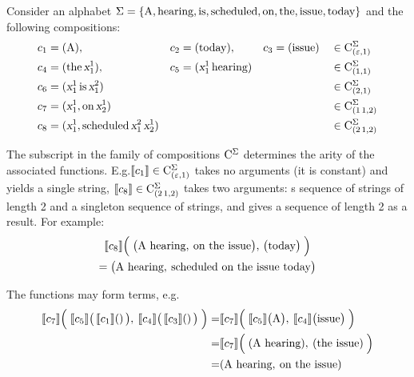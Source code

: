 \documentclass[../../document.tex]{subfiles}
\begin{document}
    \begin{example}\label{ex:lcfrs:comp}
        Consider an alphabet \(\Sigma=\{\text{A}, \text{hearing}, \text{is}, \text{scheduled}, \text{on}, \text{the}, \text{issue}, \text{today}\}\) and the following compositions:
        \begin{align*}
            c_1 &= (\text{A}), & c_2 &= (\text{today}), & c_3 &= (\text{issue}) && \in \mathrm{C}^\Sigma_{(\varepsilon, 1)} \\
            c_4 &= (\text{the} \, \textsl{x}_1^1), & c_5 &= (\textsl{x}_1^1 \, \text{hearing}) & & && \in \mathrm{C}^\Sigma_{(1,1)} \\
            c_6 &= (\textsl{x}_1^1 \, \text{is} \, \textsl{x}_1^2) && && && \in \mathrm{C}^\Sigma_{(2,1)} \\
            c_7 &= (\textsl{x}_1^1, \text{on} \, \textsl{x}_2^1) && && && \in \mathrm{C}^\Sigma_{(1\,1,2)}   \\
            c_8 &= (\textsl{x}_1^1, \text{scheduled} \, \textsl{x}_1^2 \, \textsl{x}_2^1) && && && \in \mathrm{C}^\Sigma_{(2\,1,2)}
        \end{align*}

        The subscript in the family of compositions \(\mathrm{C}^\Sigma\) determines the arity of the associated functions.
        E.g.\@ \(\llbracket c_1\rrbracket \in \mathrm{C}^\Sigma_{(\varepsilon, 1)}\) takes no arguments (it is constant) and yields a single string,
        \(\llbracket c_8\rrbracket \in \mathrm{C}^\Sigma_{(2\,1, 2)}\) takes two arguments: s sequence of strings of length 2 and a singleton sequence of strings, and gives a sequence of length 2 as a result.
        For example:
        \begin{multline*}
            \llbracket c_8\rrbracket\Big( \; \big( \text{A hearing}, \: \text{on the issue} \big), \, \big( \text{today} \big) \; \Big)
            \\= \big( \text{A hearing}, \: \text{scheduled on the issue today} \big)
        \end{multline*}

        The functions may form terms, e.g.
        \begin{align*}
            \llbracket c_7\rrbracket\Big( \; \llbracket c_5\rrbracket\big(\,\llbracket c_1\rrbracket()\,\big), \: \llbracket c_4\rrbracket\big(\,\llbracket c_3\rrbracket()\,\big) \; \Big)
            =& \llbracket c_7\rrbracket\Big( \; \llbracket c_5\rrbracket\big(\text{A}\big), \: \llbracket c_4\rrbracket\big(\text{issue}\big) \; \Big) \\
            =& \llbracket c_7\rrbracket\Big( \; (\text{A hearing}), \: (\text{the issue}) \; \Big) \\
            =& (\text{A hearing}, \: \text{on the issue})
        \end{align*}
    \end{example}
\end{document}
